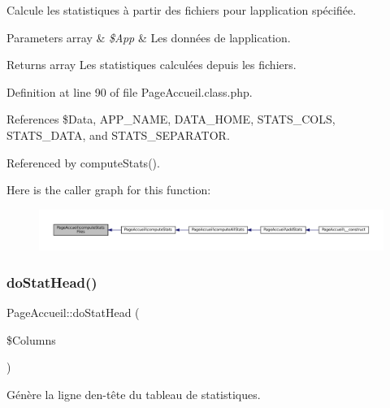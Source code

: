 Calcule les statistiques à partir des fichiers pour l\textquotesingle{}application spécifiée.


\begin{DoxyParams}[1]{Parameters}
array & {\em \$\+App} & Les données de l\textquotesingle{}application. \\
\hline
\end{DoxyParams}
\begin{DoxyReturn}{Returns}
array Les statistiques calculées depuis les fichiers. 
\end{DoxyReturn}


Definition at line 90 of file Page\+Accueil.\+class.\+php.



References \$\+Data, A\+P\+P\+\_\+\+N\+A\+ME, D\+A\+T\+A\+\_\+\+H\+O\+ME, S\+T\+A\+T\+S\+\_\+\+C\+O\+LS, S\+T\+A\+T\+S\+\_\+\+D\+A\+TA, and S\+T\+A\+T\+S\+\_\+\+S\+E\+P\+A\+R\+A\+T\+OR.



Referenced by compute\+Stats().

Here is the caller graph for this function\+:\nopagebreak
\begin{figure}[H]
\begin{center}
\leavevmode
\includegraphics[width=350pt]{class_page_accueil_a53981e78427397fc56ec11e28d8f0bd3_icgraph}
\end{center}
\end{figure}
\mbox{\label{class_page_accueil_afe6329de30c9e7b68b5a636b096928d0}} 
\subsubsection{\texorpdfstring{do\+Stat\+Head()}{doStatHead()}}
{\footnotesize\ttfamily Page\+Accueil\+::do\+Stat\+Head (\begin{DoxyParamCaption}\item[{}]{\$\+Columns }\end{DoxyParamCaption})\hspace{0.3cm}{\ttfamily [protected]}}

Génère la ligne d\textquotesingle{}en-\/tête du tableau de statistiques.


